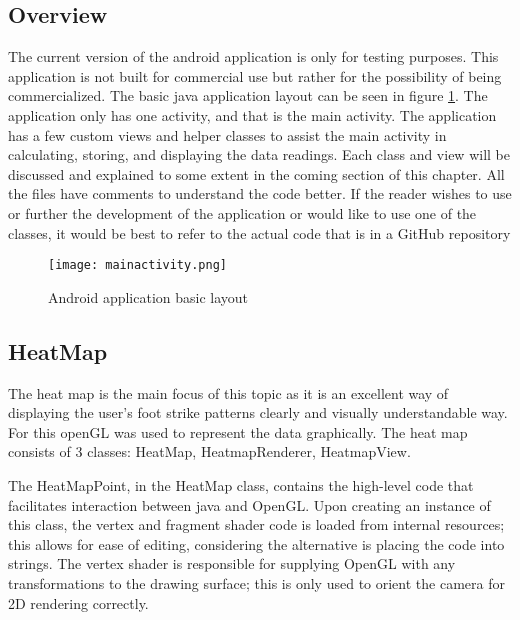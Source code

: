 \subsection{Overview}
The current version of the android application is only for testing purposes. This application is not built for commercial use but rather for the possibility of being commercialized. The basic java application layout can be seen in figure \ref{fig:javalayout}. The application only has one activity, and that is the main activity. The application has a few custom views and helper classes to assist the main activity in calculating, storing, and displaying the data readings. Each class and view will be discussed and explained to some extent in the coming section of this chapter. All the files have comments to understand the code better. If the reader wishes to use or further the development of the application or would like to use one of the classes, it would be best to refer to the actual code that is in a GitHub repository 

\begin{figure}[!htb]
  \centering
  \texttt{[image: mainactivity.png]}
  \caption{Android application basic layout}
  \label{fig:javalayout}
\end{figure}

\subsection{HeatMap}
The heat map is the main focus of this topic as it is an excellent way of displaying the user's foot strike patterns clearly and visually understandable way. For this openGL was used to represent the data graphically. The heat map consists of 3 classes: HeatMap, HeatmapRenderer, HeatmapView.

The HeatMapPoint, in the HeatMap class, contains the high-level code that facilitates interaction between java and OpenGL. Upon creating an instance of this class, the vertex and fragment shader code is loaded from internal resources; this allows for ease of editing, considering the alternative is placing the code into strings. 
The vertex shader is responsible for supplying OpenGL with any transformations to the drawing surface; this is only used to orient the camera for 2D rendering correctly.

